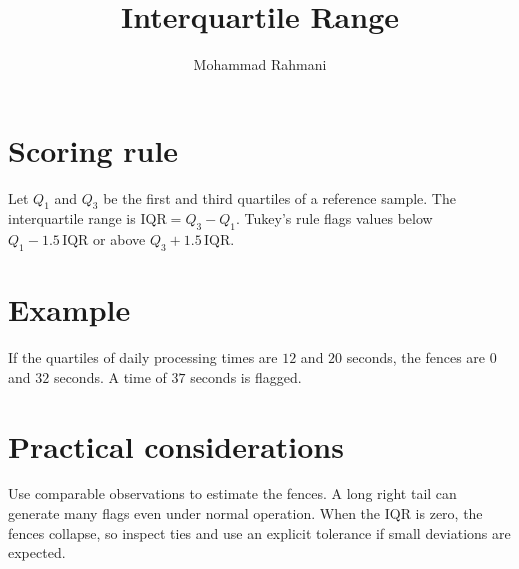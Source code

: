 \documentclass[a4paper]{article}
\title{Interquartile Range}
\date{}
\author{Mohammad Rahmani}
\begin{document}
   \maketitle

\section{Scoring rule}
Let \(Q_1\) and \(Q_3\) be the first and third quartiles of a reference sample. The interquartile range is \(\mathrm{IQR}=Q_3-Q_1\). Tukey's rule flags values below \(Q_1-1.5\,\mathrm{IQR}\) or above \(Q_3+1.5\,\mathrm{IQR}\).

\section{Example}
If the quartiles of daily processing times are \(12\) and \(20\) seconds, the fences are \(0\) and \(32\) seconds. A time of \(37\) seconds is flagged.

\section{Practical considerations}
Use comparable observations to estimate the fences. A long right tail can generate many flags even under normal operation. When the IQR is zero, the fences collapse, so inspect ties and use an explicit tolerance if small deviations are expected.



   
   
\end{document}
